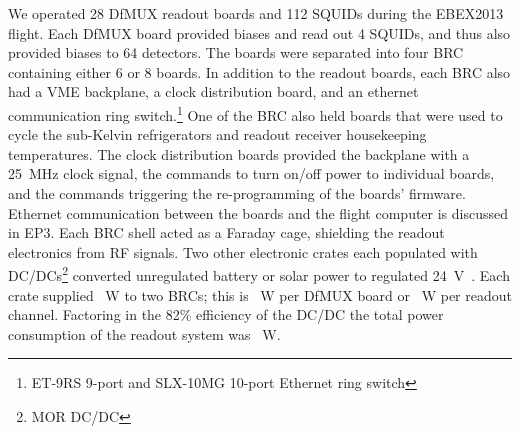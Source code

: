 \documentclass[../EBEXPaper2.tex]{subfiles}
\begin{document}


We operated 28 \ac{DfMUX} readout boards and 112 \ac{SQUID}s during the \ac{EBEX2013} flight.
Each \ac{DfMUX} board provided biases and read out 4 \ac{SQUID}s, and thus also provided biases to 64 detectors. 
The boards were separated into four \ac{BRC} containing either 6 or 8 boards.
In addition to the readout boards, each BRC also had a VME backplane, a clock distribution board, and an ethernet communication ring switch.\footnote{ET-9RS 9-port and SLX-10MG 10-port Ethernet ring switch}
One of the BRC also held boards that were used to cycle the sub-Kelvin refrigerators and readout receiver housekeeping temperatures. 
The clock distribution boards provided the backplane with a 25~MHz clock signal, the commands to turn on/off power to individual boards, and the commands triggering the re-programming of the boards' firmware.
Ethernet communication between the boards and the flight computer is discussed in \ac{EP3}.  
Each BRC shell acted as a Faraday cage, shielding the readout electronics from RF signals.
Two other electronic crates each populated with DC/DCs\footnote{MOR DC/DC} converted unregulated battery or solar power to regulated 24~V~\citep{sagiv_thesis, Sagiv_MGrossman2012}.
Each crate supplied \PperPcrate~W to two BRCs; this is \PperDfMUX~W per \ac{DfMUX} board or \PperCh~W per readout channel.
Factoring in the 82\% efficiency of the DC/DC the total power consumption of the readout system was \PoutBRC~W.
\end{document}
